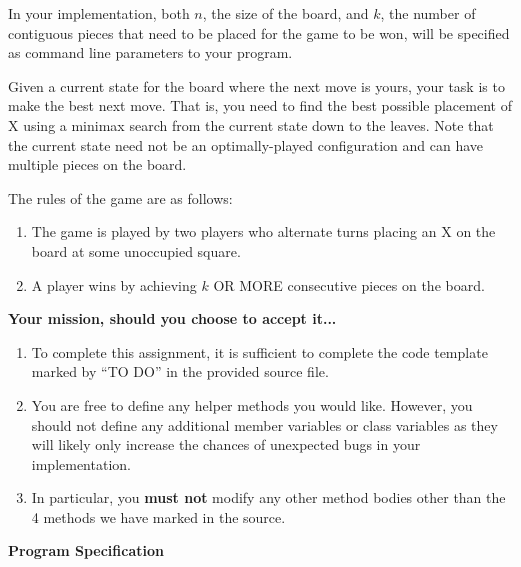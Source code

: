 \documentclass[10pt,a4paper]{article}
\begin{document}
In your implementation, both $n$, the size of the board, and $k$, the number of
contiguous pieces that need to be placed for the game to be won, will be
specified as command line parameters to your program.

Given a current state for the board where the next move is yours, your task is to
make the best next move. That is, you need to find the best possible placement
of X using a minimax search from the current state down to the leaves. Note
that the current state need not be an optimally-played configuration and can
have multiple pieces on the board.

The rules of the game are as follows:
\begin{enumerate}
\item The game is played by two players who alternate turns placing an X on the board at some unoccupied square. 
\item A player wins by achieving $k$ OR MORE consecutive pieces on the board.
\end{enumerate}


\vspace{0.5cm}

\textbf{\Large Your mission, should you choose to accept it...}


\begin{enumerate}
\item To complete this assignment, it is sufficient to complete the code template
marked by ``TO DO'' in the provided source file.
\item  You are
free to define any helper methods you would like. However, you should not define
any additional member variables or class variables as they will likely only
increase the chances of unexpected bugs in your implementation.
\item In particular, you \textbf{must not} modify any other method bodies other than the 4 methods
we have marked in the source.
\end{enumerate}

\textbf{\Large Program Specification}
\end{document}

